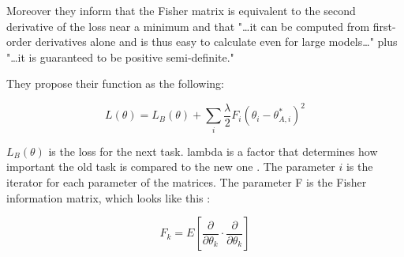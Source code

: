 Moreover they inform that the Fisher matrix is equivalent to the second derivative of the loss near a minimum and that "…it can be computed from first-order derivatives alone and is thus easy to calculate even for large models…" plus "…it is guaranteed to be positive semi-definite."
\cite{elastic-weight-consolidation}

They propose their function as the following:

$$L(\theta) = L_{B}(\theta) + \sum_{i} \frac{\lambda}{2} F_{i} (\theta_{i} - \theta_{A,i}^{*})^2 $$

$L_{B}(\theta)$ is the loss for the next task.
lambda is a factor that determines how important the old task is compared to the new one \cite{elastic-weight-consolidation}.
The parameter $i$ is the iterator for each parameter of the matrices.
The parameter F is the Fisher information matrix, which looks like this \cite{incrmental-moment-matching}:

$$F_k = E \left[ \frac{\partial}{\partial \theta_{k}} \cdot \frac{\partial}{\partial \theta_{k}} \right]$$

